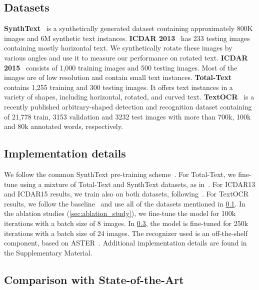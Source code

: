 \documentclass[runningheads]{llncs}
\begin{document}
\subsection{Datasets}
\label{sec:datasets}
\textbf{SynthText}~\cite{gupta2016synthetic} is a synthetically generated dataset containing approximately 800K images and 6M synthetic text instances.
\textbf{ICDAR 2013}~\cite{karatzas2013icdar} has 233 testing images containing mostly horizontal text. We synthetically rotate these images by various angles and use it to measure our performance on rotated text.
\textbf{ICDAR 2015}~\cite{karatzas2015icdar} consists of 1,000 training images and 500 testing images.
Most of the images are of low resolution and contain small text instances.
\textbf{Total-Text}~\cite{ch2017total} contains 1,255 training and 300 testing images.
It offers text instances in a variety of shapes, including horizontal, rotated, and curved text. 
\textbf{TextOCR}~\cite{singh2021textocr} is a recently published arbitrary-shaped detection and recognition dataset containing of 21,778 train, 3153 validation and 3232 test images with more than 700k, 100k and 80k annotated words, respectively. 

\subsection{Implementation details}
\label{sec:implementation}
We follow the common SynthText pre-training scheme~\cite{liao2020spotterV3,baek2020crafts}.
For Total-Text, we fine-tune using a mixture of Total-Text and SynthText datasets, as in~\cite{baek2020crafts}.
For ICDAR13 and ICDAR15 results, we train also on both datasets, following~\cite{liao2020spotterV3}.
For TextOCR results, we follow the baseline~\cite{singh2021textocr} and use all of the datasets mentioned in \cref{sec:datasets}. 
In the ablation studies (\cref{sec:ablation_study}), we fine-tune the model for 100k iterations with a batch size of 8 images.
In \cref{sec:results}, the model is fine-tuned for 250k iterations with a batch size of 24 images.
The recognizer used is an off-the-shelf component, based on ASTER~\cite{shi2018aster}.
Additional implementation details are found in the Supplementary Material.

\subsection{Comparison with State-of-the-Art}
\label{sec:results}
\end{document}
